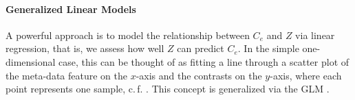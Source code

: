 

\paragraph{Generalized Linear Models}
\label{ch:Factorization:sec:Methods:sub:ObjectiveFunction:par:GLMs}

A powerful approach is to model the relationship between $C_e$ and $Z$ via linear regression,
that is, we assess how well $Z$ can predict $C_e$.
In the simple one-dimensional case, this can be thought of as fitting a line through a scatter plot
of the meta-data feature on the $x$-axis and the contrasts on the $y$-axis, where each point represents one sample,
c.\,f. .
This concept is generalized via the \acf{GLM} \cite{Nelder1972,McCullagh1989,Agresti2018}.

